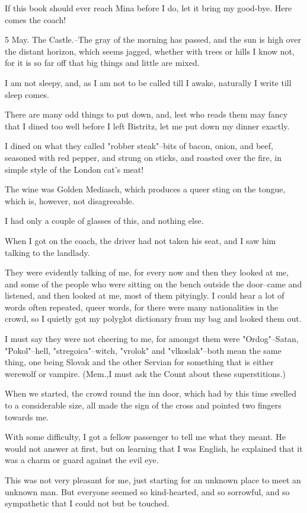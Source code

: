 If this book should ever reach Mina before I do, let it bring my good-bye. Here comes the coach!

5 May. The Castle.--The gray of the morning has passed, and the sun is high over the distant horizon, which seems jagged, whether with trees or hills I know not, for it is so far off that big things and little are mixed.

I am not sleepy, and, as I am not to be called till I awake, naturally I write till sleep comes.

There are many odd things to put down, and, lest who reads them may fancy that I dined too well before I left Bistritz, let me put down my dinner exactly.

I dined on what they called "robber steak"--bits of bacon, onion, and beef, seasoned with red pepper, and strung on sticks, and roasted over the fire, in simple style of the London cat's meat!

The wine was Golden Mediasch, which produces a queer sting on the tongue, which is, however, not disagreeable.

I had only a couple of glasses of this, and nothing else.

When I got on the coach, the driver had not taken his seat, and I saw him talking to the landlady.

They were evidently talking of me, for every now and then they looked at me, and some of the people who were sitting on the bench outside the door--came and listened, and then looked at me, most of them pityingly. I could hear a lot of words often repeated, queer words, for there were many nationalities in the crowd, so I quietly got my polyglot dictionary from my bag and looked them out.

I must say they were not cheering to me, for amongst them were "Ordog"--Satan, "Pokol"--hell, "stregoica"--witch, "vrolok" and "vlkoslak"--both mean the same thing, one being Slovak and the other Servian for something that is either werewolf or vampire. (Mem.,I must ask the Count about these superstitions.)

When we started, the crowd round the inn door, which had by this time swelled to a considerable size, all made the sign of the cross and pointed two fingers towards me.

With some difficulty, I got a fellow passenger to tell me what they meant. He would not answer at first, but on learning that I was English, he explained that it was a charm or guard against the evil eye.

This was not very pleasant for me, just starting for an unknown place to meet an unknown man. But everyone seemed so kind-hearted, and so sorrowful, and so sympathetic that I could not but be touched.

